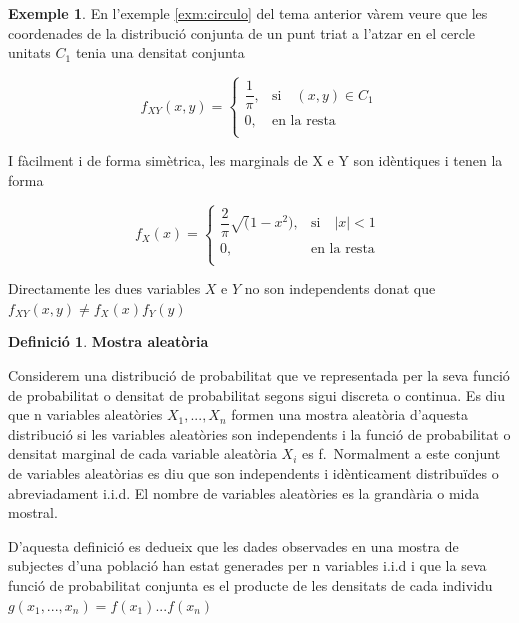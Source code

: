 \documentclass[
  catalan,
]{article}
\theoremstyle{definition}
\newtheorem{definition}{Definició}[section]
\theoremstyle{definition}
\newtheorem{example}{Exemple}[section]
\theoremstyle{definition}
\theoremstyle{definition}
\theoremstyle{remark}
\begin{document}
\begin{example}
En l'exemple \ref{exm:circulo} del tema anterior vàrem veure que les coordenades de la distribució conjunta de un punt triat a l'atzar en el cercle unitats \(C_1\) tenia una densitat conjunta

\[
 f_{XY}(x,y)=
 \begin{cases}
\dfrac{1}{\pi},          & \text{si} \quad (x,y) \in C_1 \\
0,          & \text{en la resta }  \\
\end{cases}
 \]

I fàcilment i de forma simètrica, les marginals de X e Y son idèntiques i tenen la forma

\[
 f_{X}(x)=
 \begin{cases}
\dfrac{2}{\pi}\sqrt(1-x^2),          & \text{si} \quad |x|<1 \\
0,          & \text{en la resta }  \\
\end{cases}
 \]

Directamente les dues variables \(X\) e \(Y\) no son independents donat que \(f_{XY}(x,y) \neq  f_{X}(x)f_{Y}(y)\)
\end{example}

\begin{definition}
\textbf{Mostra aleatòria}

Considerem una distribució de probabilitat que ve representada per la seva funció de probabilitat o densitat de probabilitat segons sigui discreta o continua. Es diu que n variables aleatòries \(X_1,...,X_n\) formen una mostra aleatòria d'aquesta distribució si les variables aleatòries son independents i la funció de probabilitat o densitat marginal de cada variable aleatòria \(X_i\) es f.~Normalment a este conjunt de variables aleatòrias es diu que son independents i idènticament distribuïdes o abreviadament i.i.d. El nombre de variables aleatòries es la grandària o mida mostral.
\end{definition}

D'aquesta definició es dedueix que les dades observades en una mostra de subjectes d'una població han estat generades per n variables i.i.d i que la seva funció de probabilitat conjunta es el producte de les densitats de cada individu \(g(x_1,...,x_n)=f(x_1)...f(x_n)\)
\end{document}

